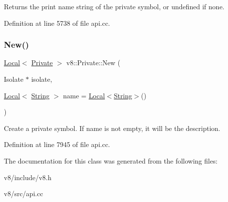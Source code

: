 Returns the print name string of the private symbol, or undefined if none. 

Definition at line 5738 of file api.\+cc.

\mbox{\label{classv8_1_1Private_ac23e6937de502a4aa3e239e67c6c3c2e}} 
\subsubsection{\texorpdfstring{New()}{New()}}
{\footnotesize\ttfamily \mbox{\hyperlink{classv8_1_1Local}{Local}}$<$ \mbox{\hyperlink{classv8_1_1Private}{Private}} $>$ v8\+::\+Private\+::\+New (\begin{DoxyParamCaption}\item[{Isolate $\ast$}]{isolate,  }\item[{\mbox{\hyperlink{classv8_1_1Local}{Local}}$<$ \mbox{\hyperlink{classv8_1_1String}{String}} $>$}]{name = {\ttfamily \mbox{\hyperlink{classv8_1_1Local}{Local}}$<$\mbox{\hyperlink{classv8_1_1String}{String}}$>$()} }\end{DoxyParamCaption})\hspace{0.3cm}{\ttfamily [static]}}

Create a private symbol. If name is not empty, it will be the description. 

Definition at line 7945 of file api.\+cc.



The documentation for this class was generated from the following files\+:\begin{DoxyCompactItemize}
\item 
v8/include/v8.\+h\item 
v8/src/api.\+cc\end{DoxyCompactItemize}
